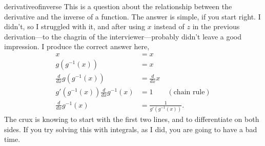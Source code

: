 \begin{answer}{derivativeofinverse}
  This is a question about the relationship between the derivative and the inverse of a function.
  The answer is simple, if you start right.
  I didn't, so I struggled with it, and after using $x$ instead of $z$ in the previous derivation---to the chagrin of the interviewer---probably didn't leave a good impression.
  I produce the correct answer here,
\begin{align*}
  x &= x \\
  g(g^{-1}(x)) &= x \\
 \frac{d}{dx} g(g^{-1}(x)) &= \frac{d}{dx} x \\
  g'(g^{-1}(x))   \frac{d}{dx} g^{-1}(x) &= 1  \qquad (\text{chain rule})\\
 \frac{d}{dx} g^{-1}(x) &= \frac{1}{g'(g^{-1}(x))}
    \text{.}
\end{align*}
The crux is knowing to start with the first two lines, and to differentiate on both sides.
If you try solving this with integrals, as I did, you are going to have a bad time.
\end{answer}
